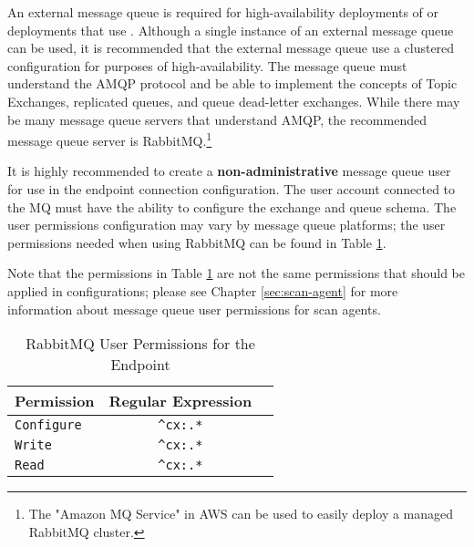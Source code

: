 An external message queue is required for high-availability deployments of \cxoneflow or deployments that use
.  Although a single instance of an external message queue can be used, it is
recommended that the external message queue use a clustered configuration for purposes of high-availability.  The message queue
must understand the AMQP protocol and be able to implement the concepts of Topic Exchanges, replicated queues, and queue
dead-letter exchanges.  While there may be many message queue servers that understand AMQP, the recommended message queue
server is RabbitMQ.\footnote{The "Amazon MQ Service" in AWS can be used to easily deploy a managed RabbitMQ cluster.}

It is highly recommended to create a \textbf{non-administrative} message queue user for use in the \cxoneflow endpoint
connection configuration.  The user account connected to the MQ must have the ability to configure the
exchange and queue schema.  The user permissions configuration may vary by message queue platforms; the user permissions
needed when using RabbitMQ can be found in Table \ref{tab:server-mq-user-perms}.  

Note that the permissions in Table \ref{tab:server-mq-user-perms} are not the same permissions
that should be applied in  configurations; please see Chapter \ref{sec:scan-agent} for more
information about message queue user permissions for scan agents.

\begin{table}[ht]
    \caption{RabbitMQ User Permissions for the \cxoneflow Endpoint}  
    \label{tab:server-mq-user-perms}      
    \begin{tabularx}{\textwidth}{lcl}
        \toprule
        \textbf{Permission} & \textbf{Regular Expression} \\
        \midrule
        \texttt{Configure} & \texttt{\^{}cx:.*} \\
        \midrule
        \texttt{Write} & \texttt{\^{}cx:.*} \\
        \midrule
        \texttt{Read} & \texttt{\^{}cx:.*} \\
        \midrule
        \bottomrule
    \end{tabularx}
\end{table}



